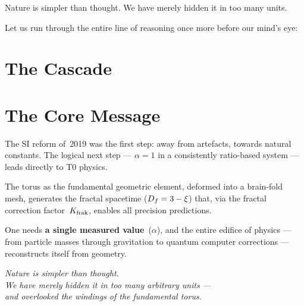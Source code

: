\epigraph{Nature is simpler than thought. We have merely hidden it in too many units.}{}

Let us run through the entire line of reasoning once more before our mind's eye:

\section{The Cascade}

\begin{center}
\end{center}

\section{The Core Message}

The SI reform of~2019 was the first step: away from artefacts, towards natural constants. The logical next step --- $\alpha = 1$ in a consistently ratio-based system --- leads directly to T0 physics.

The torus as the fundamental geometric element, deformed into a brain-fold mesh, generates the fractal spacetime ($D_f = 3 - \xi$) that, via the fractal correction factor~$K_{\text{frak}}$, enables all precision predictions.

One needs \textbf{a single measured value}~($\alpha$), and the entire edifice of physics --- from particle masses through gravitation to quantum computer corrections --- reconstructs itself from geometry.

\vspace{1em}
\begin{center}
\large\itshape
Nature is simpler than thought.\\
We have merely hidden it in too many arbitrary units ---\\
and overlooked the windings of the fundamental torus.
\end{center}
